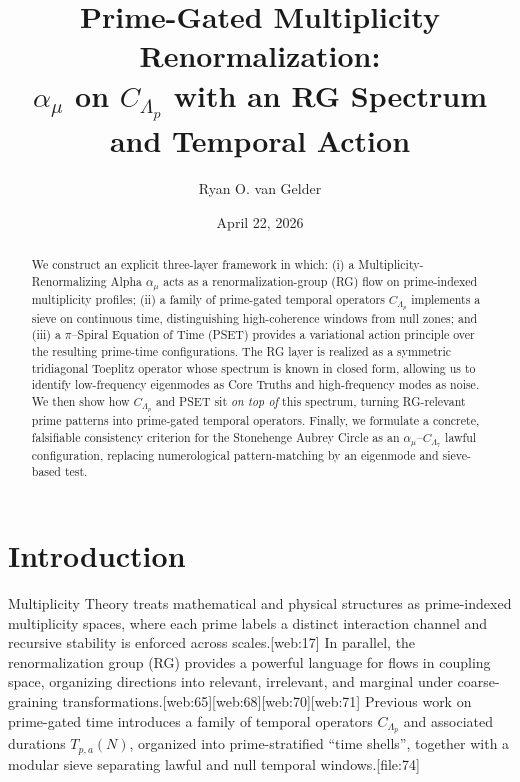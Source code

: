 \documentclass[11pt]{article}
\title{Prime-Gated Multiplicity Renormalization: \\
$\alpha_\mu$ on $C_{\Lambda_p}$ with an RG Spectrum and Temporal Action}
\author[1]{Ryan O. van Gelder}
\affil[1]{Citizen Gardens \\ The Foundation of Multiplicity}
\date{April 22, 2026}
\begin{document}
\maketitle

\begin{abstract}
We construct an explicit three-layer framework in which:
(i) a Multiplicity-Renormalizing Alpha $\alpha_\mu$ acts as a renormalization-group (RG) flow on prime-indexed multiplicity profiles;
(ii) a family of prime-gated temporal operators $C_{\Lambda_p}$ implements a sieve on continuous time, distinguishing high-coherence windows from null zones; and
(iii) a $\pi$--Spiral Equation of Time (PSET) provides a variational action principle over the resulting prime-time configurations.
The RG layer is realized as a symmetric tridiagonal Toeplitz operator whose spectrum is known in closed form, allowing us to identify low-frequency eigenmodes as Core Truths and high-frequency modes as noise.
We then show how $C_{\Lambda_p}$ and PSET sit \emph{on top of} this spectrum, turning RG-relevant prime patterns into prime-gated temporal operators.
Finally, we formulate a concrete, falsifiable consistency criterion for the Stonehenge Aubrey Circle as an $\alpha_\mu$--$C_{\Lambda_7}$ lawful configuration, replacing numerological pattern-matching by an eigenmode and sieve-based test.
\end{abstract}

\section{Introduction}

Multiplicity Theory treats mathematical and physical structures as prime-indexed multiplicity spaces, where each prime labels a distinct interaction channel and recursive stability is enforced across scales.[web:17]
In parallel, the renormalization group (RG) provides a powerful language for flows in coupling space, organizing directions into relevant, irrelevant, and marginal under coarse-graining transformations.[web:65][web:68][web:70][web:71]
Previous work on prime-gated time introduces a family of temporal operators $C_{\Lambda_p}$ and associated durations $T_{p,a}(N)$, organized into prime-stratified ``time shells'', together with a modular sieve separating lawful and null temporal windows.[file:74]
\end{document}
